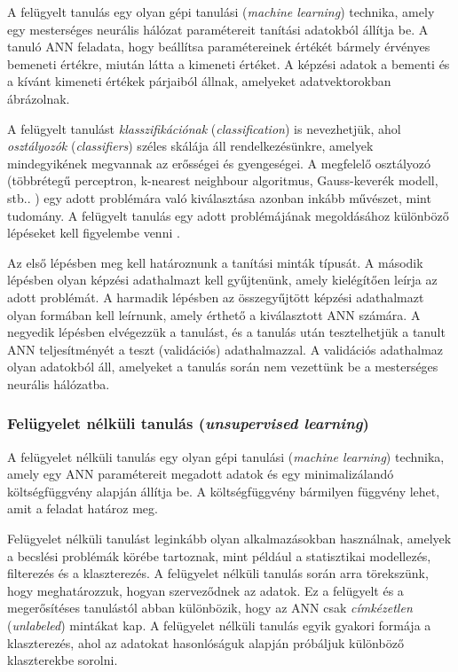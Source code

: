 \documentclass[12pt,a4]{article}
\begin{document}
	A felügyelt tanulás \cite{krenker} egy olyan gépi tanulási (\textit{machine learning}) technika, amely egy mesterséges neurális hálózat paramétereit tanítási
	adatokból állítja be. A tanuló ANN feladata, hogy beállítsa paramétereinek értékét bármely érvényes bemeneti értékre, miután látta a kimeneti értéket.
	A képzési adatok a bementi és a kívánt kimeneti értékek párjaiból állnak, amelyeket adatvektorokban ábrázolnak.
	
	
	A felügyelt tanulást \textit{klasszifikációnak} (\textit{classification}) is nevezhetjük, ahol \textit{osztályozók} (\textit{classifiers}) széles skálája áll rendelkezésünkre, amelyek mindegyikének megvannak az erősségei és gyengeségei.
	A megfelelő osztályozó (többrétegű perceptron, k-nearest neighbour algoritmus, Gauss-keverék modell, stb.. ) egy adott problémára való kiválasztása azonban inkább művészet, mint tudomány. A felügyelt tanulás egy
	adott problémájának megoldásához különböző lépéseket kell figyelembe venni \cite{krenker}.
	
	 Az első lépésben meg kell határoznunk a tanítási minták típusát. A második
	lépésben olyan képzési adathalmazt kell gyűjtenünk, amely kielégítően leírja az adott problémát.
	A harmadik lépésben az összegyűjtött képzési adathalmazt
	olyan formában kell leírnunk, amely érthető a kiválasztott ANN számára. A negyedik lépésben elvégezzük
	a tanulást, és a tanulás után tesztelhetjük a tanult ANN teljesítményét a teszt (validációs) adathalmazzal.
	A validációs adathalmaz olyan adatokból áll, amelyeket a tanulás során nem vezettünk be a mesterséges neurális hálózatba.
	
	\subsubsection{Felügyelet nélküli tanulás (\textit{unsupervised learning})}
	
	A felügyelet nélküli tanulás \cite{krenker} egy olyan gépi tanulási (\textit{machine learning}) technika, amely egy ANN paramétereit megadott adatok és egy minimalizálandó 
	költségfüggvény alapján állítja be. A költségfüggvény bármilyen függvény lehet, amit a feladat határoz meg.
	
	
	Felügyelet nélküli tanulást leginkább olyan alkalmazásokban használnak, amelyek a becslési problémák körébe tartoznak, mint például a statisztikai modellezés, filterezés és a klaszterezés. A felügyelet 
	nélküli tanulás során arra törekszünk, hogy meghatározzuk, hogyan szerveződnek az adatok. Ez a felügyelt és a megerősítéses tanulástól abban különbözik, hogy az ANN csak \textit{címkézetlen} (\textit{unlabeled}) mintákat kap. A felügyelet nélküli tanulás egyik gyakori formája a klaszterezés, ahol az adatokat hasonlóságuk alapján próbáljuk különböző klaszterekbe sorolni.
	
\end{document}

